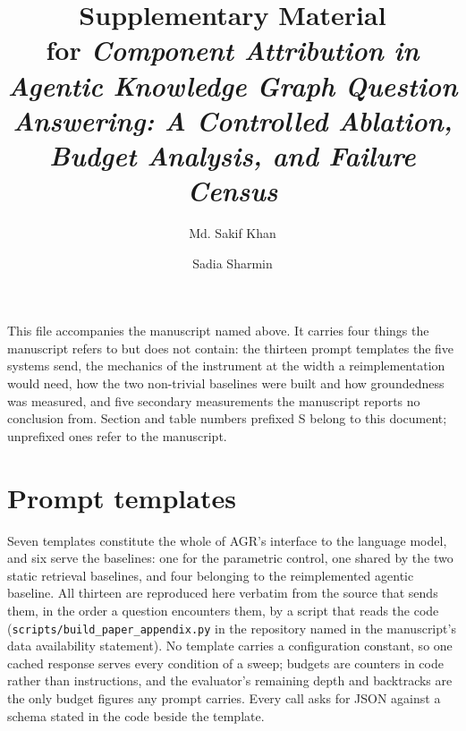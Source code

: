 \documentclass[preprint,12pt]{elsarticle}
\begin{document}
\begin{frontmatter}

\title{Supplementary Material\\
  \normalsize for \emph{Component Attribution in Agentic Knowledge Graph
    Question Answering: A Controlled Ablation, Budget Analysis, and
    Failure Census}}

\author[buet]{Md. Sakif Khan}
\author[buet]{Sadia Sharmin}


\end{frontmatter}

\noindent This file accompanies the manuscript named above. It carries
four things the manuscript refers to but does not contain: the thirteen
prompt templates the five systems send, the mechanics of the instrument
at the width a reimplementation would need, how the two non-trivial
baselines were built and how groundedness was measured, and five
secondary measurements the manuscript reports no conclusion from.
Section and table numbers prefixed \textsf{S} belong to this document;
unprefixed ones refer to the manuscript.

\section{Prompt templates}
\label{app:prompts}
Seven templates constitute the whole of AGR's interface to the
language model, and six serve the baselines: one for the parametric
control, one shared by the two static retrieval baselines, and four
belonging to the reimplemented agentic baseline. All thirteen are
reproduced here verbatim from the source that sends them, in the
order a question encounters them, by a script that reads the code
(\texttt{scripts/build\_paper\_appendix.py} in the repository named
in the manuscript's data availability statement). No template carries a
configuration constant, so one cached response serves every
condition of a sweep; budgets are counters in code rather than
instructions, and the evaluator's remaining depth and backtracks are
the only budget figures any prompt carries. Every call asks for JSON
against a schema stated in the code beside the template.









\end{document}
